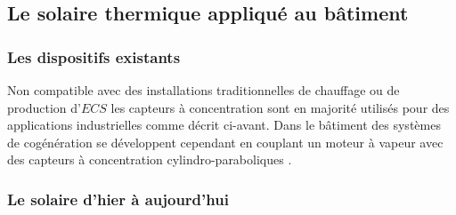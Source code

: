 \subsection{Le solaire thermique appliqué au bâtiment} %
\label{sub:le_solaire_thermique_applique_au_batiment}
\subsubsection{Les dispositifs existants} %
\label{ssub:les_dispositifs_existants}
Non compatible avec des installations traditionnelles de chauffage ou de production
d’$ECS$ les capteurs à concentration sont en majorité utilisés pour des applications
industrielles comme décrit ci-avant. Dans le bâtiment des systèmes de cogénération
se développent cependant en couplant un moteur à vapeur avec des capteurs à concentration
cylindro-paraboliques .



\subsubsection{Le solaire d’hier à aujourd’hui} %
\label{ssub:le_solaire_d_hier_a_aujourd_hui}

